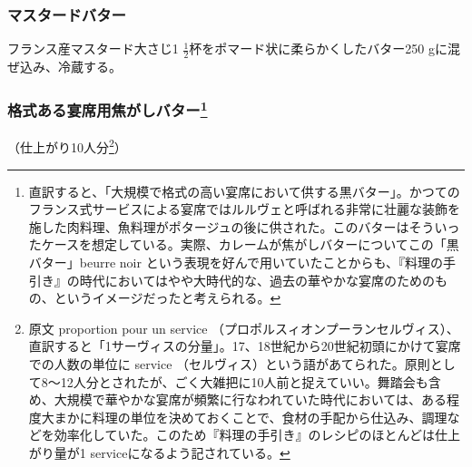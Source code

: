 \begin{recette}
\hypertarget{beurre-de-moutarde}{%
\subsubsection{マスタードバター}\label{beurre-de-moutarde}}



フランス産マスタード大さじ1
\(\frac{1}{2}\)杯をポマード状に柔らかくしたバター250
gに混ぜ込み、冷蔵する。

\hypertarget{beurre-noir-pour-les-grands-services}{%
\subsubsection[格式ある宴席用焦がしバター]{\texorpdfstring{格式ある宴席用焦がしバター\footnote{直訳すると、「大規模で格式の高い宴席において供する黒バター」。かつてのフランス式サービスによる宴席ではルルヴェと呼ばれる非常に壮麗な装飾を施した肉料理、魚料理がポタージュの後に供された。このバターはそういったケースを想定している。実際、カレームが焦がしバターについてこの「黒バター」beurre
  noir
  という表現を好んで用いていたことからも、『料理の手引き』の時代においてはやや大時代的な、過去の華やかな宴席のためのもの、というイメージだったと考えられる。}}{格式ある宴席用焦がしバター}}\label{beurre-noir-pour-les-grands-services}}


 

（仕上がり10人分\footnote{原文 proportion pour un service
  （プロポルスィオンプーランセルヴィス）、直訳すると「1サーヴィスの分量」。17、18世紀から20世紀初頭にかけて宴席での人数の単位に
  service
  （セルヴィス）という語があてられた。原則として8〜12人分とされたが、ごく大雑把に10人前と捉えていい。舞踏会も含め、大規模で華やかな宴席が頻繁に行なわれていた時代においては、ある程度大まかに料理の単位を決めておくことで、食材の手配から仕込み、調理などを効率化していた。このため『料理の手引き』のレシピのほとんどは仕上がり量が1
  serviceになるよう記されている。}）


\end{recette}
